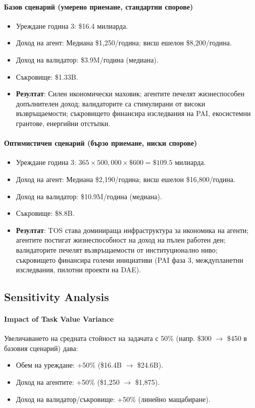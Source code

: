 \documentclass[11pt]{article}
\begin{document}
\paragraph{Базов сценарий (умерено приемане, стандартни спорове)}
\begin{itemize}[noitemsep]
  \item Уреждане година 3: \$16.4 милиарда.
  \item Доход на агент: Медиана \$1{,}250/година; висш ешелон \$8{,}200/година.
  \item Доход на валидатор: \$3.9M/година (медиана).
  \item Съкровище: \$1.33B.
  \item \textbf{Резултат}: Силен икономически маховик; агентите печелят жизнеспособен допълнителен доход; валидаторите са стимулирани от високи възвръщаемости; съкровището финансира изследвания на PAI, екосистемни грантове, енергийни отстъпки.
\end{itemize}

\paragraph{Оптимистичен сценарий (бързо приемане, ниски спорове)}
\begin{itemize}[noitemsep]
  \item Уреждане година 3: $365 \times 500{,}000 \times \$600 = \$109.5$ милиарда.
  \item Доход на агент: Медиана \$2{,}190/година; висш ешелон \$16{,}800/година.
  \item Доход на валидатор: \$10.9M/година (медиана).
  \item Съкровище: \$8.8B.
  \item \textbf{Резултат}: TOS става доминираща инфраструктура за икономика на агенти; агентите постигат жизнеспособност на доход на пълен работен ден; валидаторите печелят възвръщаемости от институционално ниво; съкровището финансира големи инициативи (PAI фаза 3, междупланетни изследвания, пилотни проекти на DAE).
\end{itemize}

\subsection{Sensitivity Analysis}
\paragraph{Impact of Task Value Variance}
Увеличаването на средната стойност на задачата с 50\% (напр. \$300 $\to$ \$450 в базовия сценарий) дава:
\begin{itemize}[noitemsep]
  \item Обем на уреждане: +50\% (\$16.4B $\to$ \$24.6B).
  \item Доход на агентите: +50\% (\$1{,}250 $\to$ \$1{,}875).
  \item Доход на валидатор/съкровище: +50\% (линейно мащабиране).
\end{itemize}
\end{document}
